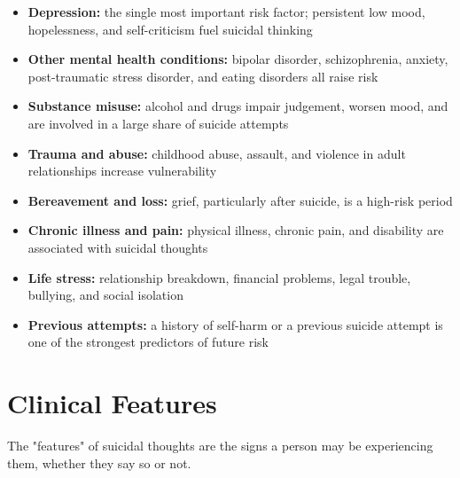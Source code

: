 \begin{itemize}
    \item \textbf{Depression:} the single most important risk factor; persistent low mood, hopelessness, and self-criticism fuel suicidal thinking
    \item \textbf{Other mental health conditions:} bipolar disorder, schizophrenia, anxiety, post-traumatic stress disorder, and eating disorders all raise risk
    \item \textbf{Substance misuse:} alcohol and drugs impair judgement, worsen mood, and are involved in a large share of suicide attempts
    \item \textbf{Trauma and abuse:} childhood abuse, assault, and violence in adult relationships increase vulnerability
    \item \textbf{Bereavement and loss:} grief, particularly after suicide, is a high-risk period
    \item \textbf{Chronic illness and pain:} physical illness, chronic pain, and disability are associated with suicidal thoughts
    \item \textbf{Life stress:} relationship breakdown, financial problems, legal trouble, bullying, and social isolation
    \item \textbf{Previous attempts:} a history of self-harm or a previous suicide attempt is one of the strongest predictors of future risk
\end{itemize}

\section*{Clinical Features}
The "features" of suicidal thoughts are the signs a person may be experiencing them, whether they say so or not.

